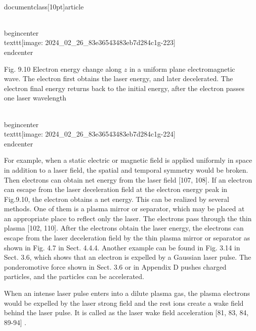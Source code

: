 \\documentclass[10pt]{article}
\begin{document}
{{{{{{\\begin{center}
\\texttt{[image: 2024\_02\_26\_83e36543483eb7d284c1g-223]}
\\end{center}

Fig. 9.10 Electron energy change along $z$ in a uniform plane electromagnetic wave. The electron first obtains the laser energy, and later decelerated. The electron final energy returns back to the initial energy, after the electron passes one laser wavelength

\\begin{center}
\\texttt{[image: 2024\_02\_26\_83e36543483eb7d284c1g-224]}
\\end{center}

For example, when a static electric or magnetic field is applied uniformly in space in addition to a laser field, the spatial and temporal symmetry would be broken. Then electrons can obtain net energy from the laser field [107, 108]. If an electron can escape from the laser deceleration field at the electron energy peak in Fig.9.10, the electron obtains a net energy. This can be realized by several methods. One of them is a plasma mirror or separator, which may be placed at an appropriate place to reflect only the laser. The electrons pass through the thin plasma [102, 110]. After the electrons obtain the laser energy, the electrons can escape from the laser deceleration field by the thin plasma mirror or separator as shown in Fig. 4.7 in Sect. 4.4.4. Another example can be found in Fig. 3.14 in Sect. 3.6, which shows that an electron is expelled by a Gaussian laser pulse. The ponderomotive force shown in Sect. 3.6 or in Appendix D pushes charged particles, and the particles can be accelerated.

When an intense laser pulse enters into a dilute plasma gas, the plasma electrons would be expelled by the laser strong field and the rest ions create a wake field behind the laser pulse. It is called as the laser wake field acceleration [81, 83, 84, 89-94] .

}}}}}}
\end{document}
